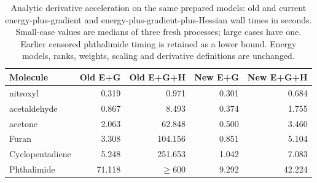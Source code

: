 \begin{table}[!htbp]
\centering\small
\caption{Analytic derivative acceleration on the same prepared models: old and current energy-plus-gradient and energy-plus-gradient-plus-Hessian wall times in seconds. Small-case values are medians of three fresh processes; large cases have one. Earlier censored phthalimide timing is retained as a lower bound. Energy models, ranks, weights, scaling and derivative definitions are unchanged.}\label{tab:hessianacceleration}
\begin{tabular}{lrrrr}
\toprule
Molecule & Old E+G & Old E+G+H & New E+G & New E+G+H \\
\midrule
nitroxyl & 0.319 & 0.971 & 0.301 & 0.684 \\
acetaldehyde & 0.867 & 8.493 & 0.374 & 1.755 \\
acetone & 2.063 & 62.848 & 0.500 & 3.460 \\
Furan & 3.308 & 104.156 & 0.851 & 5.104 \\
Cyclopentadiene & 5.248 & 251.653 & 1.042 & 7.083 \\
Phthalimide & 71.118 & $\geq600$ & 9.292 & 42.224 \\
\bottomrule
\end{tabular}
\end{table}
